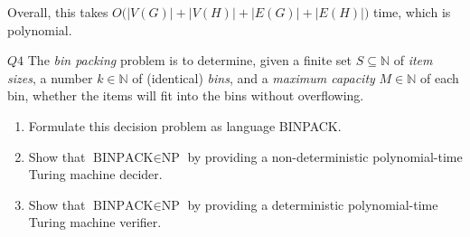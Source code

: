 \documentclass{article}
\theoremstyle{definition}
\theoremstyle{definition}
\theoremstyle{remark}
\begin{document}
Overall, this takes $O\bigl(|V(G)|+|V(H)|+|E(G)|+|E(H)|\bigr)$ time, which is polynomial.



\begin{questionbox}{$Q4$}
    The \textit{bin packing} problem is to determine, given a finite set $S\subseteq\mathbb{N}$ of \textit{item sizes}, a number $k\in\mathbb{N}$ of (identical) \textit{bins}, and a \textit{maximum capacity} $M\in\mathbb{N}$ of each bin, whether the items will fit into the bins without overflowing.
    \begin{enumerate}
        \item[$(i)$] Formulate this decision problem as language BINPACK.
        
        \item[$(ii)$] Show that $\text{BINPACK}\in\text{NP}$ by providing a non-deterministic polynomial-time Turing machine decider.
    
        \item[$(iii)$] Show that $\text{BINPACK}\in\text{NP}$ by providing a deterministic polynomial-time Turing machine verifier.
    \end{enumerate}
\end{questionbox}

\bigskip
\end{document}
